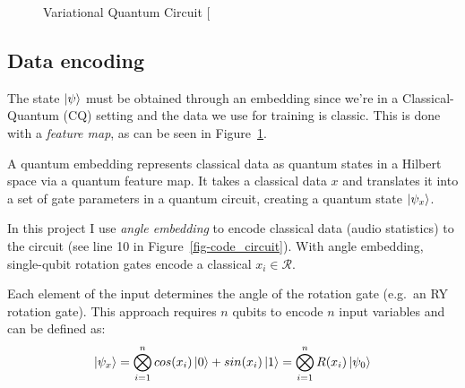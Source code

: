 \documentclass[
  13pt,
  a4paper,
  DIV=11,
  numbers=noendperiod,
  oneside]{scrreprt}
\begin{document}
\begin{figure}


\caption{\label{fig-vqc}Variational Quantum Circuit
{[}\citeproc{ref-vqc_tut}{2}{]}}

\end{figure}%

\subsection{Data encoding}\label{data-encoding}

The state \(\ket{\psi}\) must be obtained through an embedding since
we're in a Classical-Quantum (CQ) setting and the data we use for
training is classic. This is done with a \emph{feature map}, as can be
seen in Figure~\ref{fig-vqc}.

A quantum embedding represents classical data as quantum states in a
Hilbert space via a quantum feature map. It takes a classical data \(x\)
and translates it into a set of gate parameters in a quantum circuit,
creating a quantum state \(\ket{\psi_x}\).

In this project I use \emph{angle embedding} to encode classical data
(audio statistics) to the circuit (see line 10 in
Figure~\ref{fig-code_circuit}). With angle embedding, single-qubit
rotation gates encode a classical \(x_i \in \mathcal{R}\).

Each element of the input determines the angle of the rotation gate
(e.g.~an RY rotation gate). This approach requires \(n\) qubits to
encode \(n\) input variables and can be defined as: \[
\ket{\psi_x} = \bigotimes_{i=1}^n cos(x_i) \ket{0} + sin(x_i)\ket{1} = \bigotimes_{i=1}^n R(x_i)\ket{\psi_0}
\]
\end{document}
